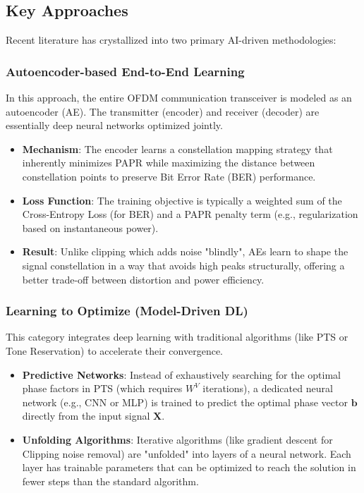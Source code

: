 \documentclass[conference]{IEEEtran}
\begin{document}
\subsection{Key Approaches}
Recent literature has crystallized into two primary AI-driven methodologies:

\subsubsection{Autoencoder-based End-to-End Learning}
In this approach, the entire OFDM communication transceiver is modeled as an autoencoder (AE). The transmitter (encoder) and receiver (decoder) are essentially deep neural networks optimized jointly.

\begin{itemize}
    \item \textbf{Mechanism}: The encoder learns a constellation mapping strategy that inherently minimizes PAPR while maximizing the distance between constellation points to preserve Bit Error Rate (BER) performance.
    \item \textbf{Loss Function}: The training objective is typically a weighted sum of the Cross-Entropy Loss (for BER) and a PAPR penalty term (e.g., regularization based on instantaneous power).
    \item \textbf{Result}: Unlike clipping which adds noise "blindly", AEs learn to shape the signal constellation in a way that avoids high peaks structurally, offering a better trade-off between distortion and power efficiency.
\end{itemize}

\subsubsection{Learning to Optimize (Model-Driven DL)}
This category integrates deep learning with traditional algorithms (like PTS or Tone Reservation) to accelerate their convergence.

\begin{itemize}
    \item \textbf{Predictive Networks}: Instead of exhaustively searching for the optimal phase factors in PTS (which requires $W^V$ iterations), a dedicated neural network (e.g., CNN or MLP) is trained to predict the optimal phase vector $\mathbf{b}$ directly from the input signal $\mathbf{X}$.
    \item \textbf{Unfolding Algorithms}: Iterative algorithms (like gradient descent for Clipping noise removal) are "unfolded" into layers of a neural network. Each layer has trainable parameters that can be optimized to reach the solution in fewer steps than the standard algorithm.
\end{itemize}
\end{document}
